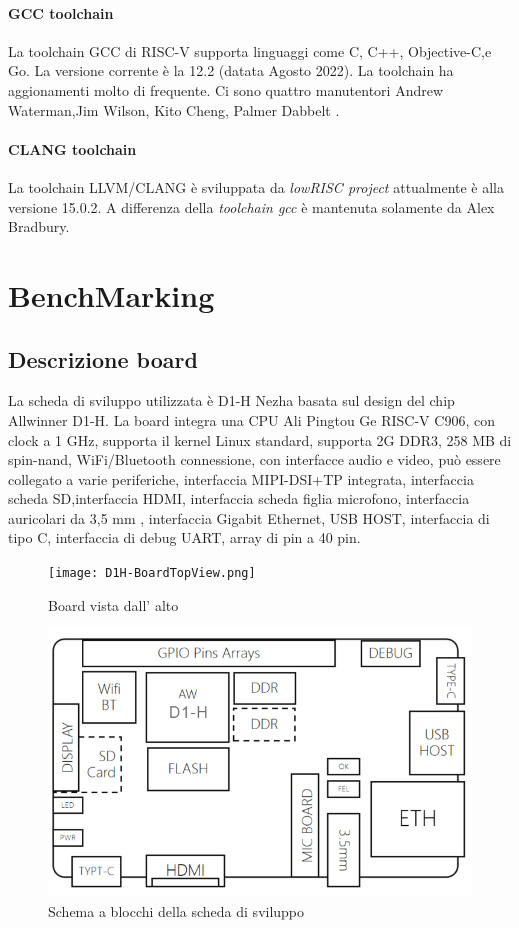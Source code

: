 \documentclass[12pt,a4paper]{report}
\begin{document}
\subsubsection{GCC toolchain}
La toolchain GCC di RISC-V supporta linguaggi come C, C++, Objective-C,e Go. La versione corrente è la 12.2 (datata Agosto 2022).  La toolchain ha aggionamenti molto di frequente.  Ci sono quattro manutentori Andrew Waterman,Jim Wilson, Kito Cheng, Palmer Dabbelt .

\subsubsection{CLANG toolchain}
La toolchain LLVM/CLANG è sviluppata da \textit{lowRISC project} attualmente è alla versione 15.0.2. A differenza della \textit{toolchain gcc} è mantenuta solamente da Alex Bradbury.


\chapter{BenchMarking}
\section{Descrizione board}

La scheda di sviluppo utilizzata è  D1-H Nezha basata sul design del chip Allwinner D1-H. La board integra una CPU Ali Pingtou Ge RISC-V C906, con clock a 1 GHz, supporta il kernel Linux standard, supporta  2G DDR3, 258 MB di spin-nand, WiFi/Bluetooth connessione, con interfacce audio e video,  può essere collegato a varie periferiche, interfaccia MIPI-DSI+TP integrata, interfaccia scheda SD,interfaccia HDMI, interfaccia scheda figlia microfono, interfaccia auricolari da 3,5 mm , interfaccia Gigabit Ethernet, USB HOST, interfaccia di tipo C, interfaccia di debug UART, array di pin a 40 pin.

\begin{figure}[h!]
\texttt{[image: D1H-BoardTopView.png]}
\caption{Board vista dall' alto}

\includegraphics[width = \textwidth]{D1H-BoardBlockView.png}
\caption{Schema a blocchi della scheda di sviluppo}
\end{figure}
\end{document}
